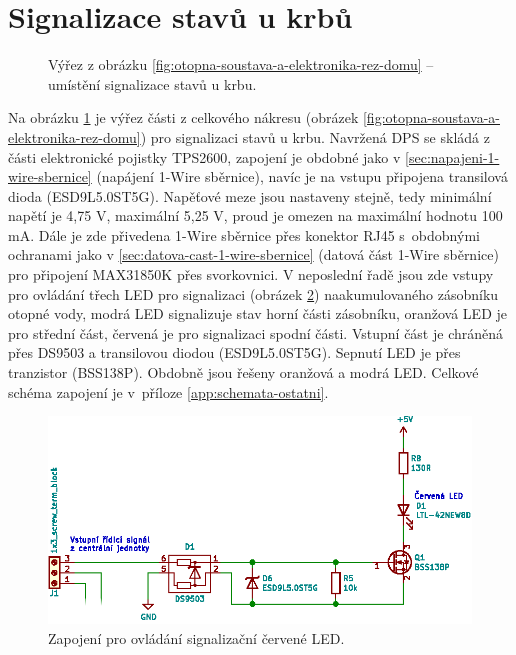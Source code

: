 \section{Signalizace stavů u krbů}
\begin{figure}[H]
   \centering
    \def\svgwidth{0.3\columnwidth}
    
    \caption[Výřez pro umístění signalizace stavů u krbu.]{Výřez z obrázku \ref{fig:otopna-soustava-a-elektronika-rez-domu} – umístění signalizace stavů u krbu.}
    \label{fig:vyrez-krb-signalizace}
\end{figure}

Na obrázku \ref{fig:vyrez-krb-signalizace} je výřez části z celkového nákresu (obrázek \ref{fig:otopna-soustava-a-elektronika-rez-domu}) pro signalizaci stavů u krbu. Navržená DPS se skládá z části elektronické pojistky TPS2600, zapojení je obdobné jako v \ref{sec:napajeni-1-wire-sbernice} (napájení 1-Wire sběrnice), navíc je na vstupu připojena transilová dioda (ESD9L5.0ST5G). Napěťové meze jsou nastaveny stejně, tedy minimální napětí je 4,75 V, maximální 5,25 V, proud je omezen na maximální hodnotu 100 mA. Dále je zde přivedena 1-Wire sběrnice přes konektor RJ45 s~obdobnými ochranami jako v \ref{sec:datova-cast-1-wire-sbernice} (datová část 1-Wire sběrnice) pro připojení MAX31850K přes svorkovnici. V neposlední řadě jsou zde vstupy pro ovládání třech LED pro signalizaci (obrázek \ref{fig:led-indikace}) naakumulovaného zásobníku otopné vody, modrá LED signalizuje stav horní části zásobníku, oranžová LED je pro střední část, červená je pro signalizaci spodní části. Vstupní část je chráněná přes DS9503 a transilovou diodou (ESD9L5.0ST5G). Sepnutí LED je přes tranzistor (BSS138P). Obdobně jsou řešeny oranžová a modrá LED. Celkové schéma zapojení je v~příloze \ref{app:schemata-ostatni}.

\begin{figure}[H]
    \centering
    \includegraphics[width=\textwidth]{images/svg/kicad/led-indikace.eps}
    \caption{Zapojení pro ovládání signalizační červené LED.}
    \label{fig:led-indikace}
\end{figure}




